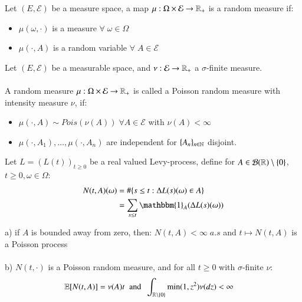 \begin{definition}
Let $(E, \mathcal{E})$ be a measure space, a map $\mu : \Omega \times \mathcal{E} \to \mathbb{R}_{+}$ is a random measure if: 
\begin{itemize}[leftmargin=*]
    \item $\mu(\omega, \cdot)$ is a measure $\forall\; \omega \in \Omega$ 
    \item $\mu(\cdot, A)$ is a random variable $\forall\; A \in \mathcal{E}$
\end{itemize}
\end{definition} 

\begin{definition}
Let $(E, \mathcal{E})$ be a measurable space, and $\nu: \mathcal{E}\to \mathbb{R}_{+}$ a $\sigma$-finite measure. 
\\~\\  
A random measure $\mu: \Omega \times \mathcal{E} \to \mathbb{R}_{+}$ is called a Poisson random measure with intensity measure $\nu$, if: 
\begin{itemize}[leftmargin=*]
    \item $\mu(\cdot, A) \sim Pois(\nu(A)) \; \forall A \in \mathcal{E}$ with $\nu(A) < \infty$
    \item $\mu(\cdot, A_{1}), \dots, \mu(\cdot, A_{n})$ are independent for $\{A_{n}\}_{n\in \mathbb{N} }$ disjoint. 
\end{itemize}
\end{definition} 

\begin{theorem}
Let $L = (L(t))_{t\geq 0}$ be a real valued Levy-process, define for $A \in \mathcal{B}(\mathbb{R})\setminus \{0\}$, $t\geq 0, \omega \in \Omega$: 
\begin{align*}
N(t, A)(\omega) &= \#\{
s\leq t: \Delta L(s)(\omega) \in A
\} \\ 
&= 
\sum_{s\leq t}\mathbbm{1}_{A}(\Delta L(s)(\omega))
\end{align*}

a) if $A$ is bounded away from zero, then: 
$
N(t,A) < \infty \; a.s
$
and $t\mapsto N(t,A)$ is a Poisson process
\\~\\ 
b) $N(t, \cdot)$ is a Poisson random measure, and for all $t\geq 0$ with $\sigma$-finite $\nu$: 
\begin{align*}
\mathbb{E}[N(t,A)] &= \nu(A)t \;\; \text{and}\;\; \int_{\mathbb{R}\setminus\{0\}}\min(1, z^{2})\nu(dz) < \infty    
\end{align*}
\end{theorem} 

